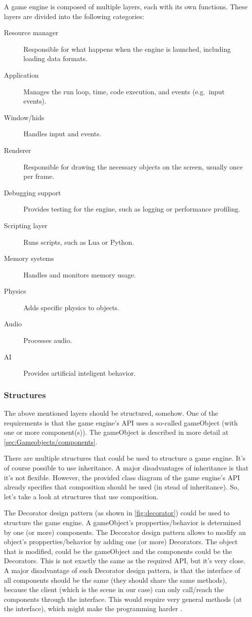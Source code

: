 \documentclass{projdoc}
\begin{document}
A game engine is composed of multiple layers, each with its own functions. These
layers are divided into the following categories:\noparbreak
\begin{description}
	\item[Resource manager] Responsible for what happens when the engine is launched,
		including loading data formats.
	\item[Application] Manages the run loop, time, code execution, and events
		(e.g.~input events).
	\item[Window/\glspl{hid}] Handles input and events.
	\item[Renderer] Responsible for drawing the necessary objects on the screen,
		usually once per frame.
	\item[Debugging support] Provides testing for the engine, such as logging or
		performance profiling.
	\item[Scripting layer] Runs scripts, such as Lua or Python.
	\item[Memory systems] Handles and monitors memory usage.
	\item[Physics] Adds specific physics to objects.
	\item[Audio] Processes audio.
	\item[AI] Provides artificial inteligent behavior.
\end{description}

\subsubsection{Structures}

The above mentioned layers should be structured, somehow. One of the requirements is
that the game engine's API uses a so-called gameObject (with one or more
component(s)). The gameObject is described in more detail at
\cref{sec:Gameobjects/components}.

There are multiple structures that could be used to structure a game engine. It's of
course possible to use inheritance. A major disadvantages of inheritance is that it's
not flexible. However, the provided class diagram of the game engine's API already
specifies that composition should be used (in stead of inheritance). So, let's take a
look at structures that use composition.

The Decorator design pattern (as shown in \cref{fig:decorator}) could be used to
structure the game engine. A gameObject's propperties/behavior is determined by one
(or more) components. The Decorator design pattern allows to modify an object's
propperties/behavior by adding one (or more) Decorators. The object that is modified,
could be the gameObject and the components could be the Decorators. This is not
exactly the same as the required API, but it's very close. A major disadvantage of
such Decorator design pattern, is that the interface of all components should be the
same (they should share the same methods), because the client (which is the scene in
our case) can only call/reach the components through the interface. This would
require very general methods (at the interface), which might make the programming
harder \autocite{man:DecoratorDesignPattern,man:Decorator}.
\end{document}
